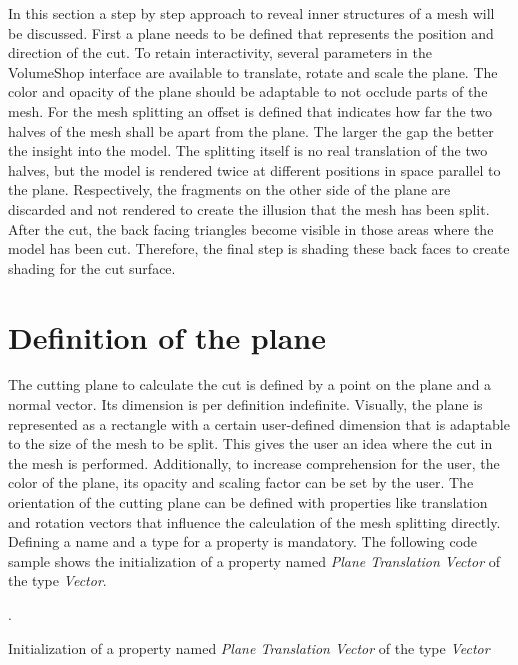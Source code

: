 
In this section a step by step approach to reveal inner structures of a mesh will be discussed. First a plane needs to be defined that represents the position and direction of the cut. To retain interactivity, several parameters in the VolumeShop interface are available to translate, rotate and scale the plane. The color and opacity of the plane should be adaptable to not occlude parts of the mesh. For the mesh splitting an offset is defined that indicates how far the two halves of the mesh shall be apart from the plane. The larger the gap the better the insight into the model. The splitting itself is no real translation of the two halves, but the model is rendered twice at different positions in space parallel to the plane. Respectively, the fragments on the other side of the plane are discarded and not rendered to create the illusion that the mesh has been split. After the cut, the back facing triangles become visible in those areas where the model has been cut. Therefore, the final step is shading these back faces to create shading for the cut surface.

\section{Definition of the plane}
\label{chap:planeDefinition}
The cutting plane to calculate the cut is defined by a point on the plane and a normal vector. Its dimension is per definition indefinite. Visually, the plane is represented as a rectangle with a certain user-defined dimension that is adaptable to the size of the mesh to be split. This gives the user an idea where the cut in the mesh is performed. Additionally, to increase comprehension for the user, the color of the plane, its opacity and scaling factor can be set by the user. The orientation of the cutting plane can be defined with properties like translation and rotation vectors that influence the calculation of the mesh splitting directly.\\
Defining a name and a type for a property is mandatory. The following code sample shows the initialization of a property named \emph{Plane Translation Vector} of the type \emph{Vector}.

\begin{algorithm}
\GetPlugin.\GetProperty
\caption{Initialization of a property named \emph{Plane Translation Vector} of the type \emph{Vector}}
\end{algorithm}


